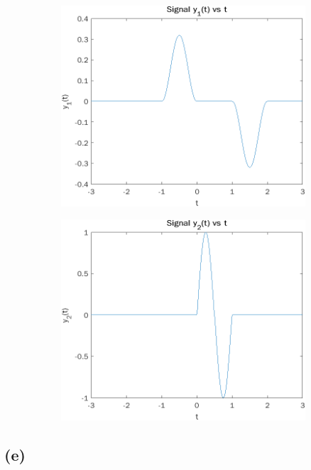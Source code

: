 \documentclass[12pt]{article}
\begin{document}
\begin{figure}[h]
\centering
\begin{subfigure}{.5\textwidth}
  \centering
  \includegraphics[width=.9\linewidth]{4d1}
\end{subfigure}%
\begin{subfigure}{.5\textwidth}
  \centering
  \includegraphics[width=.9\linewidth]{4d2}
\end{subfigure}
\end{figure}
\subsection*{(e)}
\end{document}
